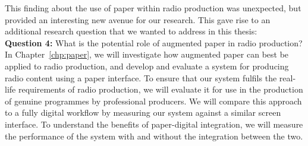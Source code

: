 This finding about the use of paper within radio production was unexpected, but provided an interesting new avenue for
our research. This gave rise to an additional research question that we wanted to address in this thesis:
\\

\noindent
\textbf{Question 4:} What is the potential role of augmented paper in radio production?
\\

In Chapter~\ref{chp:paper}, we will investigate how augmented paper can best be applied to radio production, and
develop and evaluate a system for producing radio content using a paper interface.  To ensure that our system fulfils
the real-life requirements of radio production, we will evaluate it for use in the production of genuine programmes by
professional producers.  We will compare this approach to a fully digital workflow by measuring our system against a
similar screen interface. To understand the benefits of paper-digital integration, we will measure the performance of
the system with and without the integration between the two.

